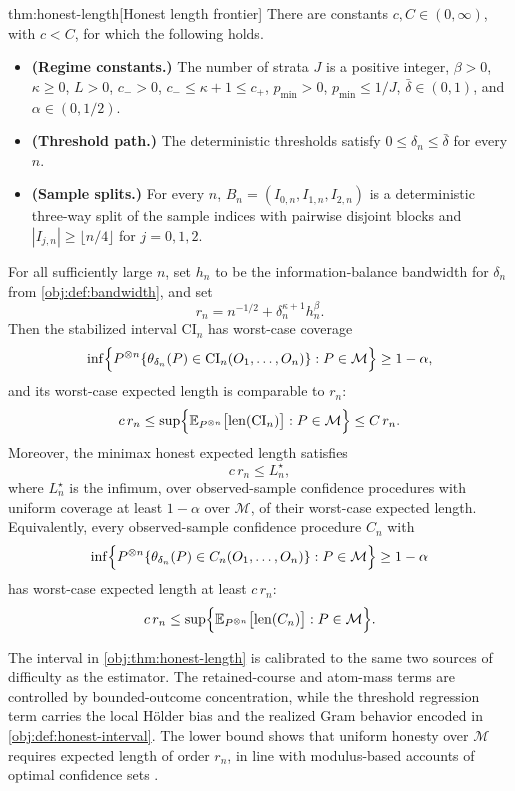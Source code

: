 \begin{theoremv}{thm:honest-length}[Honest length frontier]
There are constants \(c,C\in(0,\infty)\), with \(c<C\), for which the following holds.

\begin{itemize}
\item \textbf{(Regime constants.)} The number of strata \(J\) is a positive integer, \(\beta>0\), \(\kappa\geq0\), \(L>0\), \(c_->0\), \(c_-\leq \kappa+1\leq c_+\), \(p_{\min}>0\), \(p_{\min}\leq 1/J\), \(\bar\delta\in(0,1)\), and \(\alpha\in(0,1/2)\).
\item \textbf{(Threshold path.)} The deterministic thresholds satisfy \(0\leq \delta_n\leq \bar\delta\) for every \(n\).
\item \textbf{(Sample splits.)} For every \(n\), \(B_n=(I_{0,n},I_{1,n},I_{2,n})\) is a deterministic three-way split of the sample indices with pairwise disjoint blocks and \(|I_{j,n}|\geq \lfloor n/4\rfloor\) for \(j=0,1,2\).
\end{itemize}

For all sufficiently large \(n\), set \(h_n\) to be the information-balance bandwidth for \(\delta_n\) from \cref{obj:def:bandwidth}, and set
\[
r_n=n^{-1/2}+\delta_n^{\kappa+1}h_n^\beta .
\]
Then the stabilized interval \(\mathrm{CI}_n\) has worst-case coverage
\[
\inf\Bigl\{
P^{\otimes n}\{\theta_{\delta_n}(P)\in \mathrm{CI}_n(O_1,\ldots,O_n)\}:
P\in\mathcal M
\Bigr\}\geq 1-\alpha,
\]
and its worst-case expected length is comparable to \(r_n\):
\[
c\,r_n
\leq
\sup\Bigl\{
\mathbb E_{P^{\otimes n}}\bigl[\operatorname{len}(\mathrm{CI}_n)\bigr]:
P\in\mathcal M
\Bigr\}
\leq
C\,r_n .
\]
Moreover, the minimax honest expected length satisfies
\[
c\,r_n
\leq
L_n^\star,
\]
where \(L_n^\star\) is the infimum, over observed-sample confidence procedures with uniform coverage at least \(1-\alpha\) over \(\mathcal M\), of their worst-case expected length. Equivalently, every observed-sample confidence procedure \(C_n\) with
\[
\inf\Bigl\{
P^{\otimes n}\{\theta_{\delta_n}(P)\in C_n(O_1,\ldots,O_n)\}:
P\in\mathcal M
\Bigr\}\geq 1-\alpha
\]
has worst-case expected length at least \(c\,r_n\):
\[
c\,r_n
\leq
\sup\Bigl\{
\mathbb E_{P^{\otimes n}}\bigl[\operatorname{len}(C_n)\bigr]:
P\in\mathcal M
\Bigr\}.
\]
\end{theoremv}

The interval in \cref{obj:thm:honest-length} is calibrated to the same two sources of difficulty as the estimator. The retained-course and atom-mass terms are controlled by bounded-outcome concentration, while the threshold regression term carries the local Hölder bias and the realized Gram behavior encoded in \cref{obj:def:honest-interval}. The lower bound shows that uniform honesty over \(\mathcal M\) requires expected length of order \(r_n\), in line with modulus-based accounts of optimal confidence sets \citep{Low1997NonparametricConfidenceIntervals,ArmstrongKolesar2020}.

